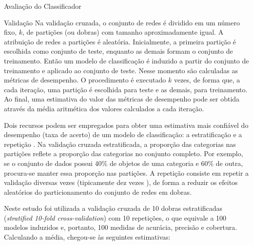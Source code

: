 \begin{section}{Avaliação do Classificador}
\begin{subsection}{Validação}
		Na validação cruzada, o conjunto de redes é dividido em um número fixo, $k$, de partições (ou dobras) com tamanho aproximadamente igual. A atribuição de redes a partições é aleatória. Inicialmente, a primeira partição é escolhida como conjunto de teste, enquanto as demais formam o conjunto de treinamento. Então um modelo de classificação é induzido a partir do conjunto de treinamento e aplicado ao conjunto de teste. Nesse momento são calculadas as métricas de desempenho. O procedimento é executado $k$ vezes, de forma que, a cada iteração, uma partição é escolhida para teste e as demais, para treinamento. Ao final, uma estimativa do valor das métricas de desempenho pode ser obtida através da média aritmética dos valores calculados a cada iteração.

		Dois recursos podem ser empregados para obter uma estimativa mais confiável do desempenho (taxa de acerto) de um modelo de classificação: a estratificação e a repetição \cite{Witten2005}. Na validação cruzada estratificada, a proporção das categorias nas partições reflete a proporção das categorias no conjunto completo. Por exemplo, se o conjunto de dados possui 40\% de objetos de uma categoria e 60\% de outra, procura-se manter essa proporção nas partições. A repetição consiste em repetir a validação diversas vezes (tipicamente dez vezes \cite{Witten2005}), de forma a reduzir os efeitos aleatórios do particionamento do conjunto de redes em dobras.

		Neste estudo foi utilizada a validação cruzada de 10 dobras estratificadas (\emph{stratified 10-fold cross-validation}) com 10 repetições, o que equivale a 100 modelos induzidos e, portanto, 100 medidas de acurácia, precisão e cobertura. Calculando a média, chegou-se às seguintes estimativas:




\end{subsection}
\end{section}
